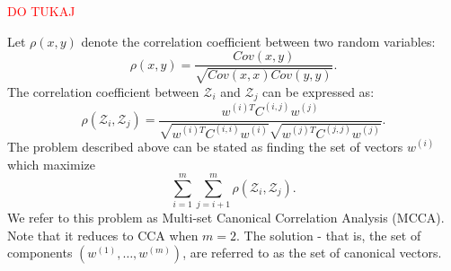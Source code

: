 \textcolor{red}{DO TUKAJ}



Let $\rho\left(x,y\right)$ denote the correlation
 coefficient between two random variables:
\begin{equation*}
\rho\left(x,y\right) =
 \frac{Cov\left(x,y\right)}{\sqrt{Cov\left(x,x\right) Cov\left(y,y\right)}}.
\end{equation*}
 The correlation coefficient between $\mathcal{Z}_i$ and
 $\mathcal{Z}_j$ can be expressed as:
\begin{equation*}
\rho\left(\mathcal{Z}_i, \mathcal{Z}_j\right) = \frac{w^{(i)T} C^{(i,j)}
   w^{(j)}}{\sqrt{w^{(i)T} C^{(i,i)} w^{(i)}}\sqrt{w^{(j)T}
     C^{(j,j)} w^{(j)}} }.
\end{equation*}
%
%
The problem described above can be stated as
finding the set of vectors $w^{(i)}$
which maximize
\begin{equation}\label{eq:SUMCOR}
\tag{SUMCOR}
\sum_{i = 1}^m \sum_{j = i+1}^m
\rho\left(\mathcal{Z}_i, \mathcal{Z}_j\right).
\end{equation}
We refer to this problem as Multi-set Canonical
Correlation Analysis (MCCA). Note that it reduces to CCA when
$m=2$. The solution - that is, the set of components $\left(w^{(1)}, \ldots, w^{(m)}\right)$, are referred to as the set of canonical vectors.%
%

